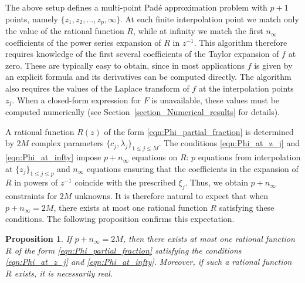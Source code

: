 \documentclass[12pt]{article}
\newtheorem{proposition}{Proposition}
\begin{document}
\vspace{0.2cm}


The above setup defines a multi-point Pad\'e approximation problem with $p+1$ points, namely $\{z_1,z_2,\dots,z_p,\infty\}$. At each finite interpolation point we match only the value of the rational
 function $R$, while at infinity we match the first $n_{\infty}$ coefficients of the power series expansion of $R$ in $z^{-1}$. This algorithm therefore requires knowledge of the first several coefficients of the Taylor expansion of $f$ at zero. These are typically easy to obtain, since in most applications $f$ is given by an explicit formula and its derivatives can be computed directly. The algorithm also requires the values of the Laplace transform of $f$ at the interpolation points $z_j$. When a closed-form expression for $F$ is unavailable, these values must be computed numerically (see Section~\ref{section_Numerical_results} for details).  

A rational function $R(z)$ of the form \eqref{eqn:Phi_partial_fraction} is determined by $2M$ complex parameters $\{c_j, \lambda_j\}_{1\le j \le M}$. The conditions \eqref{eqn:Phi_at_z_j} and \eqref{eqn:Phi_at_infty} impose $p+n_{\infty}$ equations on $R$: $p$ equations from interpolation at $\{z_j\}_{1\le j \le p}$ and $n_{\infty}$ equations ensuring that the coefficients in the expansion of $R$ in powers of $z^{-1}$ coincide with the prescribed $\xi_j$. Thus, we obtain $p+n_{\infty}$ constraints for $2M$ unknowns. It is therefore natural to expect that when $p+n_{\infty}=2M$, there exists at most one rational function $R$ satisfying these conditions. The following proposition confirms this expectation.  

\begin{proposition}\label{prop_unique}
If $p+n_{\infty}=2M$, then there exists at most one rational function $R$ of the form \eqref{eqn:Phi_partial_fraction} satisfying the conditions \eqref{eqn:Phi_at_z_j} and \eqref{eqn:Phi_at_infty}. Moreover, if such a rational function $R$ exists, it is necessarily real.
\end{proposition}
\end{document}
